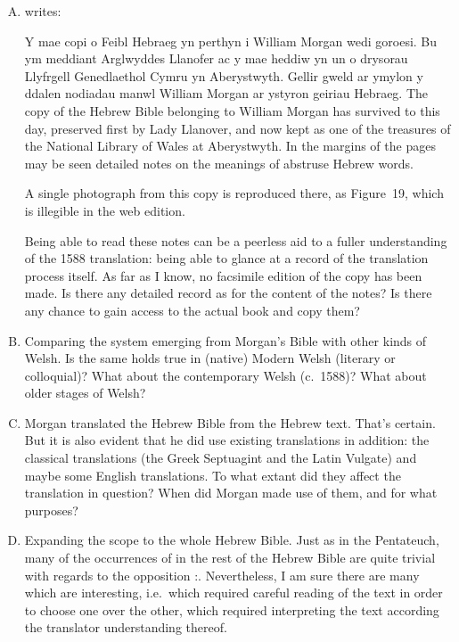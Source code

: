 \begin{enumerate}[A.]
	\item \cite{morgan.p:1988:beibl} writes:
		\begin{changemargin}{1cm}{0cm}
			\begin{bilingquote}
				\transline
				{{Y mae copi o Feibl Hebraeg yn perthyn i William Morgan wedi goroesi. Bu ym meddiant Arglwyddes Llanofer ac y mae heddiw yn un o drysorau Llyfrgell Genedlaethol Cymru yn Aberystwyth. Gellir gweld ar ymylon y ddalen nodiadau manwl William Morgan ar ystyron geiriau Hebraeg.}}
				{The copy of the Hebrew Bible belonging to William Morgan has survived to this day, preserved first by Lady Llanover, and now kept as one of the treasures of the National Library of Wales at Aberystwyth. In the margins of the pages may be seen detailed notes on the meanings of abstruse Hebrew words.}
			\end{bilingquote}
		\end{changemargin}
		\vspace{-0.5cm}
		A single photograph from this copy is reproduced there, as Figure~19, which is illegible in the web edition.

		Being able to read these notes can be a peerless aid to a fuller understanding of the 1588 translation: being able to glance at a record of the translation process itself. As far as I know, no facsimile edition of the copy has been made. Is there any detailed record as for the content of the notes? Is there any chance to gain access to the actual book and copy them?

	\item Comparing the system emerging from Morgan’s Bible with other kinds of Welsh. Is the same holds true in (native) Modern Welsh (literary or colloquial)? What about the contemporary Welsh (c.~1588)? What about older stages of Welsh?

	\item Morgan translated the Hebrew Bible from the Hebrew text. That’s certain. But it is also evident that he did use existing translations in addition: the classical translations (the Greek Septuagint and the Latin Vulgate) and maybe some English translations. To what extant did they affect the translation in question? When did Morgan made use of them, and for what purposes?

	\item Expanding the scope to the whole Hebrew Bible. Just as in the Pentateuch, many of the occurrences of {\shama} in the rest of the Hebrew Bible are quite trivial with regards to the opposition \mbox{:}. Nevertheless, I am sure there are many which are interesting, i.e.\ which required careful reading of the text in order to choose one over the other, which required interpreting the text according the translator understanding thereof.
		

\end{enumerate}
